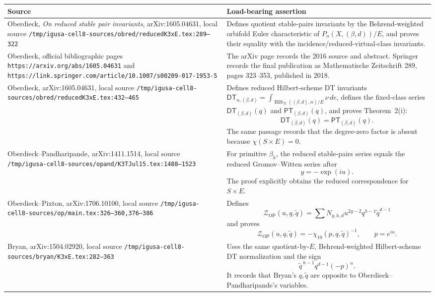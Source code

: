 \begin{center}
\small
\begin{tabular}{p{}p{}}
\hline
Source & Load-bearing assertion \\
\hline
Oberdieck, \emph{On reduced stable pair invariants},
arXiv:1605.04631, local source
\texttt{/tmp/igusa-cell8-sources/obred/reducedK3xE.tex:289--322}
&
Defines quotient stable-pairs invariants by the Behrend-weighted
orbifold Euler characteristic of \(P_n(X,(\beta,d))/E\), and proves
their equality with the incidence/reduced-virtual-class invariants. \\
Oberdieck, official bibliographic pages
\texttt{https://arxiv.org/abs/1605.04631} and
\texttt{https://link.springer.com/article/10.1007/s00209-017-1953-5}
&
The arXiv page records the 2016 source and abstract.  Springer records
the final publication as Mathematische Zeitschrift 289, pages 323--353,
published in 2018. \\
Oberdieck, arXiv:1605.04631, local source
\texttt{/tmp/igusa-cell8-sources/obred/reducedK3xE.tex:432--465}
&
Defines reduced Hilbert-scheme DT invariants
\(\mathsf{DT}_{n,(\beta,d)}
=\int_{\operatorname{Hilb}_X((\beta,d),n)/E}\nu\,de\),
defines the fixed-class series
\(\mathsf{DT}_{(\beta,d)}(q)\) and \(\mathsf{PT}_{(\beta,d)}(q)\), and
proves Theorem~2(i):
\[
\mathsf{DT}_{(\beta,d)}(q)=\mathsf{PT}_{(\beta,d)}(q).
\]
The same passage records that the degree-zero factor is absent because
\(\chi(S\times E)=0\). \\
Oberdieck--Pandharipande, arXiv:1411.1514, local source
\texttt{/tmp/igusa-cell8-sources/opand/K3TJul15.tex:1488--1523}
&
For primitive \(\beta_h\), the reduced stable-pairs series equals the
reduced Gromov--Witten series after
\[
y=-\exp(iu).
\]
The proof explicitly obtains the reduced correspondence for
\(S\times E\). \\
Oberdieck--Pixton, arXiv:1706.10100, local source
\texttt{/tmp/igusa-cell8-sources/op/main.tex:326--360,376--386}
&
Defines
\[
\mathcal Z_{\mathrm{OP}}(u,q,\widetilde q)
=\sum N_{g,h,d}u^{2g-2}q^{h-1}\widetilde q^{d-1}
\]
and proves
\[
\mathcal Z_{\mathrm{OP}}(u,q,\widetilde q)
=-\chi_{10}(p,q,\widetilde q)^{-1},
\qquad p=e^{iu}.
\]
\\
Bryan, arXiv:1504.02920, local source
\texttt{/tmp/igusa-cell8-sources/bryan/K3xE.tex:282--363}
&
Uses the same quotient-by-\(E\), Behrend-weighted Hilbert-scheme DT
normalization and the sign
\[
\widetilde q^{\,h-1}q^{d-1}(-p)^n.
\]
It records that Bryan's \(q,\widetilde q\) are opposite to
Oberdieck--Pandharipande's variables. \\
\hline
\end{tabular}
\end{center}

